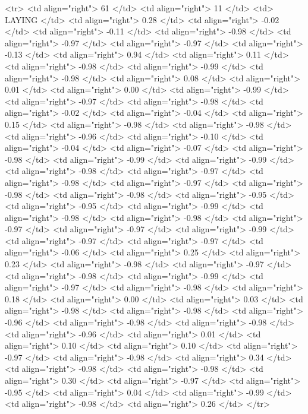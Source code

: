   <tr> <td align="right"> 61 </td> <td align="right">  11 </td> <td> LAYING </td> <td align="right"> 0.28 </td> <td align="right"> -0.02 </td> <td align="right"> -0.11 </td> <td align="right"> -0.98 </td> <td align="right"> -0.97 </td> <td align="right"> -0.97 </td> <td align="right"> -0.13 </td> <td align="right"> 0.94 </td> <td align="right"> 0.11 </td> <td align="right"> -0.98 </td> <td align="right"> -0.99 </td> <td align="right"> -0.98 </td> <td align="right"> 0.08 </td> <td align="right"> 0.01 </td> <td align="right"> 0.00 </td> <td align="right"> -0.99 </td> <td align="right"> -0.97 </td> <td align="right"> -0.98 </td> <td align="right"> -0.02 </td> <td align="right"> -0.04 </td> <td align="right"> 0.15 </td> <td align="right"> -0.98 </td> <td align="right"> -0.98 </td> <td align="right"> -0.96 </td> <td align="right"> -0.10 </td> <td align="right"> -0.04 </td> <td align="right"> -0.07 </td> <td align="right"> -0.98 </td> <td align="right"> -0.99 </td> <td align="right"> -0.99 </td> <td align="right"> -0.98 </td> <td align="right"> -0.97 </td> <td align="right"> -0.98 </td> <td align="right"> -0.97 </td> <td align="right"> -0.98 </td> <td align="right"> -0.98 </td> <td align="right"> -0.95 </td> <td align="right"> -0.95 </td> <td align="right"> -0.99 </td> <td align="right"> -0.98 </td> <td align="right"> -0.98 </td> <td align="right"> -0.97 </td> <td align="right"> -0.97 </td> <td align="right"> -0.99 </td> <td align="right"> -0.97 </td> <td align="right"> -0.97 </td> <td align="right"> -0.06 </td> <td align="right"> 0.25 </td> <td align="right"> 0.23 </td> <td align="right"> -0.98 </td> <td align="right"> -0.97 </td> <td align="right"> -0.98 </td> <td align="right"> -0.99 </td> <td align="right"> -0.97 </td> <td align="right"> -0.98 </td> <td align="right"> 0.18 </td> <td align="right"> 0.00 </td> <td align="right"> 0.03 </td> <td align="right"> -0.98 </td> <td align="right"> -0.98 </td> <td align="right"> -0.96 </td> <td align="right"> -0.98 </td> <td align="right"> -0.98 </td> <td align="right"> -0.96 </td> <td align="right"> 0.01 </td> <td align="right"> 0.10 </td> <td align="right"> 0.10 </td> <td align="right"> -0.97 </td> <td align="right"> -0.98 </td> <td align="right"> 0.34 </td> <td align="right"> -0.98 </td> <td align="right"> -0.98 </td> <td align="right"> 0.30 </td> <td align="right"> -0.97 </td> <td align="right"> -0.95 </td> <td align="right"> 0.04 </td> <td align="right"> -0.99 </td> <td align="right"> -0.98 </td> <td align="right"> 0.26 </td> </tr>
